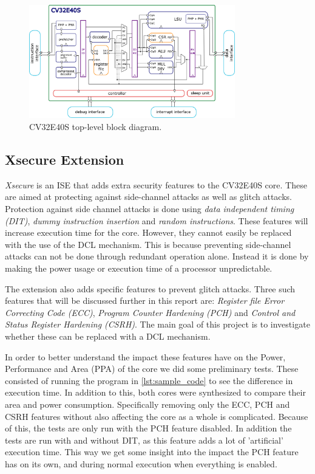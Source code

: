 \begin{figure}[h!]
    \centering
    \includegraphics[width=0.8\textwidth]{docs/images/CV32E40S_Block_Diagram.png}
    \caption{CV32E40S top-level block diagram\cite{cv32e40s_manual}.}
    \label{fig:cv32e40s_block}
\end{figure}

\subsection{Xsecure Extension}
\label{sec:xsecure}

\textit{Xsecure} is an ISE that adds extra security features to the CV32E40S core. These are aimed at protecting against side-channel attacks as well as glitch attacks. Protection against side channel attacks is done using \textit{data independent timing (DIT)}, \textit{dummy instruction insertion} and \textit{random instructions}\cite{cv32e40s_manual}. These features will increase execution time for the core. However, they cannot easily be replaced with the use of the DCL mechanism. This is because preventing side-channel attacks can not be done through redundant operation alone. Instead it is done by making the power usage or execution time of a processor unpredictable. 

The extension also adds specific features to prevent glitch attacks. Three such features that will be discussed further in this report are: \textit{Register file Error Correcting Code (ECC)}, \textit{Program Counter Hardening (PCH)} and \textit{Control and Status Register Hardening (CSRH)}. The main goal of this project is to investigate whether these can be replaced with a DCL mechanism. 

In order to better understand the impact these features have on the Power, Performance and Area (PPA) of the core we did some preliminary tests. These consisted of running the program in \autoref{lst:sample_code} to see the difference in execution time. In addition to this, both cores were synthesized to compare their area and power consumption. Specifically removing only the ECC, PCH and CSRH features without also affecting the core as a whole is complicated. Because of this, the tests are only run with the PCH feature disabled. In addition the tests are run with and without DIT, as this feature adds a lot of 'artificial' execution time. This way we get some insight into the impact the PCH feature has on its own, and during normal execution when everything is enabled. 

